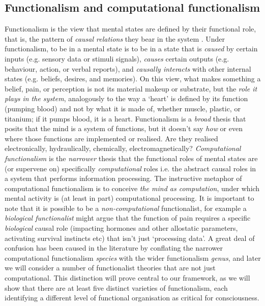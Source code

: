 \documentclass[11pt, a4paper, onecolumn, gdm]{google}
\begin{document}
\subsection{Functionalism and computational functionalism}\label{functionalism-and-computational-functionalism}

Functionalism is the view that mental states are defined by their functional role, that is, the pattern of \emph{causal relations} they bear in the system \citep{putnam1967}.
Under functionalism, to be in a mental state is to be in a state that is \emph{caused} by certain inputs (e.g. sensory data or stimuli signals), \emph{causes} certain outputs (e.g. behaviour, action, or verbal reports), and \emph{causally interacts} with other internal states (e.g. beliefs, desires, and memories).
On this view, what makes something a belief, pain, or perception is not its material makeup or substrate, but the \emph{role it plays in the system}, analogously to the way a `heart' is defined by its function (pumping blood) and not by what it is made of, whether muscle, plastic, or titanium; if it pumps blood, it is a heart.
Functionalism is a \emph{broad} thesis that posits that the mind is a system of functions, but it doesn't say \emph{how} or even where those functions are implemented or realised.
Are they realised electronically, hydraulically, chemically, electromagnetically?
\emph{Computational functionalism} \citep{putnam1960} is the \emph{narrower} thesis that the functional roles of mental states are (or supervene on) specifically \emph{computational} roles i.e. the abstract causal roles in a system that performs information processing.
The instructive metaphor of computational functionalism is to conceive \emph{the mind as computation}, under which mental activity is (at least in part) computational processing.
It is important to note that it is possible to be a \emph{non-computational} functionalist, for example a \emph{biological functionalist} \citep{millikan1984} might argue that the function of pain requires a specific \emph{biological} causal role (impacting hormones and other allostatic parameters, activating survival instincts etc) that isn't just `processing data'.
A great deal of confusion has been caused in the literature by conflating the narrower computational functionalism \emph{species} with the wider functionalism \emph{genus}, and later we will consider a number of functionalist theories that are not just computational.
This distinction will prove central to our framework, as we will show that there are at least five distinct varieties of functionalism, each identifying a different level of functional organisation as critical for consciousness.
\end{document}

